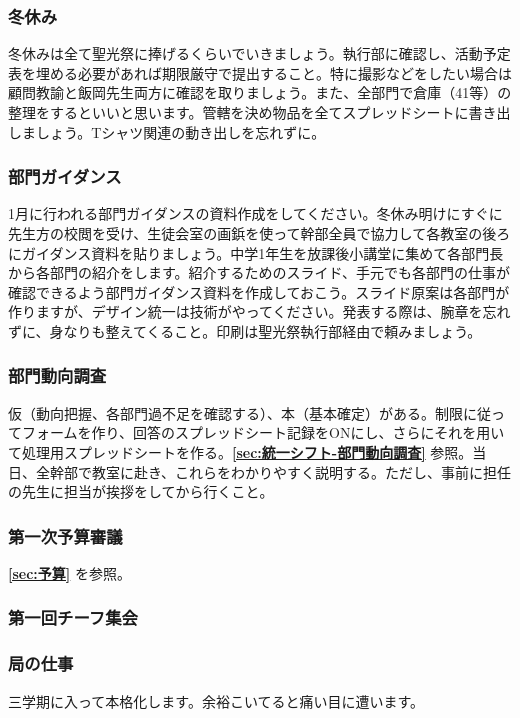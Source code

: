 \documentclass[dvipdfmx,jb5]{jarticle}
\begin{document}
\subsubsection{冬休み}
冬休みは全て聖光祭に捧げるくらいでいきましょう。執行部に確認し、活動予定表を埋める必要があれば期限厳守で提出すること。特に撮影などをしたい場合は顧問教諭と飯岡先生両方に確認を取りましょう。また、全部門で倉庫（41等）の整理をするといいと思います。管轄を決め物品を全てスプレッドシートに書き出しましょう。Tシャツ関連の動き出しを忘れずに。

\subsubsection{部門ガイダンス}
1月に行われる部門ガイダンスの資料作成をしてください。冬休み明けにすぐに先生方の校閲を受け、生徒会室の画鋲を使って幹部全員で協力して各教室の後ろにガイダンス資料を貼りましょう。中学1年生を放課後小講堂に集めて各部門長から各部門の紹介をします。紹介するためのスライド、手元でも各部門の仕事が確認できるよう部門ガイダンス資料を作成しておこう。スライド原案は各部門が作りますが、デザイン統一は技術がやってください。発表する際は、腕章を忘れずに、身なりも整えてくること。印刷は聖光祭執行部経由で頼みましょう。

\subsubsection{部門動向調査}
仮（動向把握、各部門過不足を確認する）、本（基本確定）がある。制限に従ってフォームを作り、回答のスプレッドシート記録をONにし、さらにそれを用いて処理用スプレッドシートを作る。{\bf \ref{sec:統一シフト-部門動向調査}} 参照。当日、全幹部で教室に赴き、これらをわかりやすく説明する。ただし、事前に担任の先生に担当が挨拶をしてから行くこと。

\subsubsection{第一次予算審議}
{\bf \ref{sec:予算}} を参照。

\subsubsection{第一回チーフ集会}

\subsubsection{局の仕事}
三学期に入って本格化します。余裕こいてると痛い目に遭います。
\end{document}

